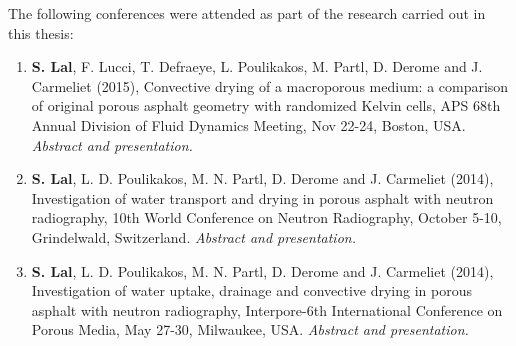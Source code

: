 \bigskip
\bigskip
The following conferences were attended as part of the research carried out in this thesis:
\begin{enumerate}
	\item \textbf{S. Lal}, F. Lucci, T. Defraeye, L. Poulikakos, M. Partl, D. Derome and J. Carmeliet (2015), Convective drying of a macroporous medium: a comparison of original porous asphalt geometry with randomized Kelvin cells, APS 68th Annual Division of Fluid Dynamics Meeting, Nov 22-24, Boston, USA. \textit{Abstract and presentation.}
	
	\item \textbf{S. Lal}, L. D. Poulikakos, M. N. Partl, D. Derome and J. Carmeliet (2014), Investigation of water transport and drying in porous asphalt with neutron radiography, 10th World Conference on Neutron Radiography, October 5-10, Grindelwald, Switzerland. \textit{Abstract and presentation.}
	
	\item \textbf{S. Lal}, L. D. Poulikakos, M. N. Partl, D. Derome and J. Carmeliet (2014), Investigation of water uptake, drainage and convective drying in porous asphalt with neutron radiography, Interpore-6th International Conference on Porous Media, May 27-30, Milwaukee, USA. \textit{Abstract and presentation.}
\end{enumerate}